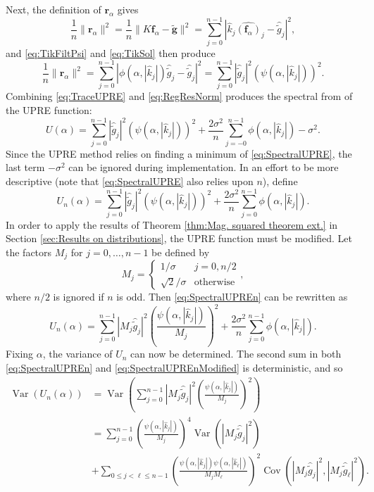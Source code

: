 \documentclass[12pt]{article}
\newcommand{\gnoise}{\widetilde{g}}	%
\newcommand{\gnoiseVec}{\widetilde{\mathbf{g}}}	%
\newcommand{\kMat}{K}	%
\newcommand{\fVec}{\mathbf{f}}	%
\newcommand{\regparam}{\alpha}
\newcommand{\freg}{\fVec_{\regparam}}	%
\newcommand{\filt}{\phi}
\newcommand{\mfilt}{\psi}
\newcommand{\noiseSD}{\sigma}	%
\newcommand{\Var}{\operatorname{Var}}	%
\newcommand{\Cov}{\operatorname{Cov}}	%
\newcommand{\regres}{\mathbf{r}_{\regparam}}	%
\newcommand{\U}{U}	%
\begin{document}
Next, the definition of $\regres$ gives
\[\frac{1}{n}\|\regres\|^2 = \frac{1}{n}\|\kMat\freg - \gnoiseVec\|^2 = \sum_{j = 0}^{n-1} |\widehat{k}_j\widehat{(\freg)}_j - \widehat{\gnoise}_j|^2,\]
and \eqref{eq:TikFiltPsi} and \eqref{eq:TikSol} then produce
\begin{equation}
\frac{1}{n}\|\regres\|^2 = \sum_{j = 0}^{n-1} |\filt(\regparam,|\widehat{k}_j|)\widehat{\gnoise}_j - \widehat{\gnoise}_j|^2 = \sum_{j = 0}^{n-1} |\widehat{\gnoise}_j|^2(\mfilt(\regparam,|\widehat{k}_j|))^2.
\label{eq:RegResNorm}
\end{equation}
Combining \eqref{eq:TraceUPRE} and \eqref{eq:RegResNorm} produces the spectral from of the UPRE function:
\begin{equation}
\U(\regparam) = \sum_{j = 0}^{n-1} |\widehat{\gnoise}_j|^2(\mfilt(\regparam,|\widehat{k}_j|))^2 + \frac{2\noiseSD^2}{n}\sum_{j = -0}^{n-1} \filt(\regparam,|\widehat{k}_j|) - \noiseSD^2.
\label{eq:SpectralUPRE}
\end{equation} 
Since the UPRE method relies on finding a minimum of \eqref{eq:SpectralUPRE}, the last term $-\noiseSD^2$ can be ignored during implementation. In an effort to be more descriptive (note that \eqref{eq:SpectralUPRE} also relies upon $n$), define
\begin{equation}
\U_n(\regparam) = \sum_{j = 0}^{n-1} |\widehat{\gnoise}_j|^2(\mfilt(\regparam,|\widehat{k}_j|))^2 + \frac{2\noiseSD^2}{n}\sum_{j = 0}^{n-1} \filt(\regparam,|\widehat{k}_j|).
\label{eq:SpectralUPREn}
\end{equation}
In order to apply the results of Theorem \ref{thm:Mag. squared theorem ext.} in Section \ref{sec:Results on distributions}, the UPRE function must be modified. Let the factors $M_j$ for $j = 0,\ldots,n-1$ be defined by
\[M_j = \begin{cases}
1/\noiseSD & j = 0, n/2 \\
\sqrt{2}/\noiseSD & \text{otherwise}
\end{cases},\]
where $n/2$ is ignored if $n$ is odd. Then \eqref{eq:SpectralUPREn} can be rewritten as
\begin{equation}
\label{eq:SpectralUPREnModified}
\U_n(\regparam) = \sum_{j = 0}^{n-1} |M_j\widehat{\gnoise}_j|^2\left(\frac{\mfilt(\regparam,|\widehat{k}_j|)}{M_j}\right)^2 + \frac{2\noiseSD^2}{n}\sum_{j = 0}^{n-1} \filt(\regparam,|\widehat{k}_j|).
\end{equation}
Fixing $\regparam$, the variance of $\U_n$ can now be determined. The second sum in both \eqref{eq:SpectralUPREn} and \eqref{eq:SpectralUPREnModified} is deterministic, and so
\begin{align*}
\Var\left(\U_n(\regparam)\right) &= \Var\left(\sum_{j = 0}^{n-1} |M_j\widehat{\gnoise}_j|^2\left(\frac{\mfilt(\regparam,|\widehat{k}_j|)}{M_j}\right)^2\right) \\
&= \sum_{j=0}^{n-1} \left(\frac{\mfilt(\regparam,|\widehat{k}_j|)}{M_j}\right)^4 \Var\left(|M_j\widehat{\gnoise}_j|^2\right) \\
&+ \sum_{0 \leq j< \ell \leq n-1} \left(\frac{\mfilt(\regparam,|\widehat{k}_j|)\mfilt(\regparam,|\widehat{k}_\ell|)}{M_j M_\ell}\right)^2 \Cov\left(|M_j\widehat{\gnoise}_j|^2,|M_j\widehat{\gnoise}_\ell|^2\right).
\end{align*}
\end{document}
